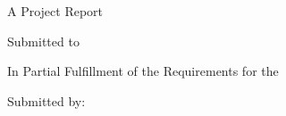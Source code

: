 
\thispagestyle{empty}

\begin{center}

\vspace*{1cm}

{\Large\bfseries \projecttitle}

\vspace{1.5cm}

{\large A Project Report}

\vspace{0.5cm}

{\large Submitted to}

\vspace{0.5cm}

{\large \departmentname}

\vspace{0.5cm}

{\large \collegename}

\vspace{0.5cm}

{\large In Partial Fulfillment of the Requirements for the}

\vspace{0.5cm}

{\large \degreename}

\vspace{2cm}

{\large Submitted by:}

\vspace{0.5cm}

{\large \studentname}

\vspace{0.3cm}

{\large \studentid}

\vspace{2cm}

{\large \submissiondate}

\vspace*{\fill}

\end{center}
